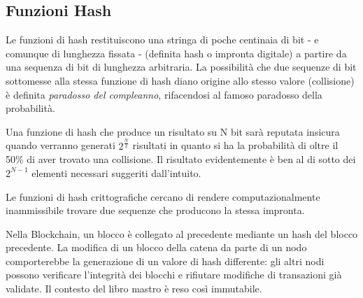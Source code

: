 \subsection{Funzioni Hash}
Le funzioni di hash restituiscono una stringa di poche centinaia di bit - e comunque di lunghezza fissata - (definita hash o impronta digitale) a partire da una sequenza di bit di lunghezza arbitraria. La possibilità che due sequenze di bit sottomesse alla stessa funzione di hash diano origine allo stesso valore (collisione) è definita \textit{paradosso del compleanno}, rifacendosi al famoso paradosso della probabilità.

Una funzione di hash che produce un risultato su N bit sarà reputata insicura quando verranno generati $2^{\frac{N}{2}}$ risultati in quanto si ha la probabilità di oltre il 50\% di aver trovato una collisione. Il risultato evidentemente è ben al di sotto dei $2^{N-1}$ elementi necessari suggeriti dall'intuito.

Le funzioni di hash crittografiche cercano di rendere computazionalmente inammissibile trovare due sequenze che producono la stessa impronta.

\vspace{5mm}

Nella Blockchain, un blocco è collegato al precedente mediante un hash del blocco precedente. La modifica di un blocco della catena da parte di un nodo comporterebbe la generazione di un valore di hash differente: gli altri nodi possono verificare l'integrità dei blocchi e rifiutare modifiche di transazioni già validate. Il contesto del libro mastro è reso così immutabile.

